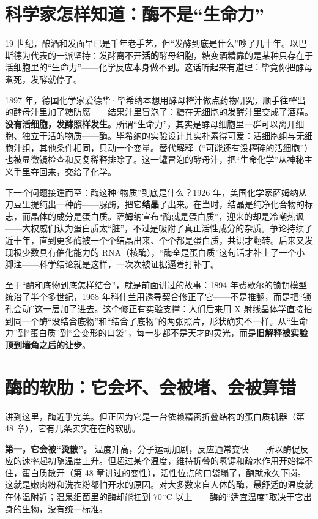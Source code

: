 \section{科学家怎样知道：酶不是“生命力”}

\begin{zhengju}
19 世纪，酿酒和发面早已是千年老手艺，但“发酵到底是什么”吵了几十年。以巴斯德为代表的一派坚持：发酵离不开\textbf{活的}酵母细胞，糖变酒精靠的是某种只存在于活细胞里的“生命力”——化学反应本身做不到。这话听起来有道理：毕竟你把酵母煮死，发酵就停了。

1897 年，德国化学家爱德华·毕希纳本想用酵母榨汁做点药物研究，顺手往榨出的酵母汁里加了糖防腐——结果汁里冒泡了：糖在无细胞的发酵汁里变成了酒精。\textbf{没有活细胞，发酵照样发生}。所谓“生命力”，其实是酵母细胞里一群可以离开细胞、独立干活的物质——酶。毕希纳的实验设计其实朴素得可爱：活细胞组与无细胞汁组，其他条件相同，只动一个变量。替代解释（“可能还有没榨碎的活细胞”）也被显微镜检查和反复稀释排除了。这一罐冒泡的酵母汁，把“生命化学”从神秘主义手里夺回来，交给了化学。

下一个问题接踵而至：酶这种“物质”到底是什么？1926 年，美国化学家萨姆纳从刀豆里提纯出一种酶——脲酶，把它\textbf{结晶}了出来。在当时，结晶是纯净化合物的标志，而晶体的成分是蛋白质。萨姆纳宣布“酶就是蛋白质”，迎来的却是冷嘲热讽——大权威们认为蛋白质太“脏”，不过是吸附了真正活性成分的杂质。争论持续了近十年，直到更多酶被一个个结晶出来、个个都是蛋白质，共识才翻转。后来又发现极少数具有催化能力的 RNA（核酶），“酶全是蛋白质”这句话才补上了一个小脚注——科学结论就是这样，一次次被证据逼着打补丁。

至于“酶和底物到底怎样结合”，就是前面讲过的故事：1894 年费歇尔的锁钥模型统治了半个多世纪，1958 年科什兰用诱导契合修正了它——不是推翻，而是把“锁孔会动”这一层加了进去。这个修正有实验支撑：人们后来用 X 射线晶体学直接拍到同一个酶“没结合底物”和“结合了底物”的两张照片，形状确实不一样。从“生命力”到“蛋白质”到“会变形的口袋”，每一步都不是天才的灵光，而是\textbf{旧解释被实验顶到墙角之后的让步}。
\end{zhengju}

\section{酶的软肋：它会坏、会被堵、会被算错}

讲到这里，酶近乎完美。但正因为它是一台依赖精密折叠结构的蛋白质机器（第 48 章），它有几条实实在在的软肋。

\textbf{第一，它会被“烫散”。} 温度升高，分子运动加剧，反应通常变快——所以酶促反应的速率起初随温度上升。但超过某个温度，维持折叠的氢键和疏水作用开始撑不住，蛋白质散开（第 48 章讲过的变性），活性位点的口袋塌了，酶就永久下岗。这就是嫩肉粉和洗衣粉都怕开水的原因。对大多数来自人体的酶，最舒适的温度就在体温附近；温泉细菌里的酶却能扛到 $70\,^{\circ}\mathrm{C}$ 以上——酶的“适宜温度”取决于它出身的生物，没有统一标准。

